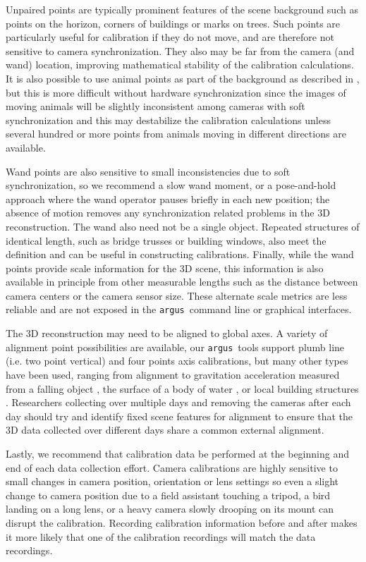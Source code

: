\documentclass[fleqn,10pt]{wlpeerj}
\newcommand{\argus}{\texttt{argus}}
\begin{document}
Unpaired points are typically prominent features of the scene background such as points on the horizon, corners of buildings or marks on trees. Such points are particularly useful for calibration if they do not move, and are therefore not sensitive to camera synchronization.  They also may be far from the camera (and wand) location, improving mathematical stability of the calibration calculations. It is also possible to use animal points as part of the background as described in \citep{Theriault:2014}, but this is more difficult without hardware synchronization since the images of moving animals will be slightly inconsistent among cameras with soft synchronization and this may destabilize the calibration calculations unless several hundred or more points from animals moving in different directions are available.

Wand points are also sensitive to small inconsistencies due to soft synchronization, so we recommend a slow wand moment, or a pose-and-hold approach where the wand operator pauses briefly in each new position; the absence of motion removes any synchronization related problems in the 3D reconstruction. The wand also need not be a single object.  Repeated structures of identical length, such as bridge trusses or building windows, also meet the definition and can be useful in constructing calibrations. Finally, while the wand points provide scale information for the 3D scene, this information is also available in principle from other measurable lengths such as the distance between camera centers or the camera sensor size. These alternate scale metrics are less reliable and are not exposed in the \argus\ command line or graphical interfaces.

The 3D reconstruction may need to be aligned to global axes.  A variety of alignment point possibilities are available, our \argus\ tools support plumb line (i.e. two point vertical) and four points axis calibrations, but many other types have been used, ranging from alignment to gravitation acceleration measured from a falling object \citep{Shelton14}, the surface of a body of water \citep{clifton2015}, or local building structures \citep{sholtis2015}. Researchers collecting over multiple days and removing the cameras after each day should try and identify fixed scene features for alignment to ensure that the 3D data collected over different days share a common external alignment.

Lastly, we recommend that calibration data be performed at the beginning and end of each data collection effort. Camera calibrations are highly sensitive to small changes in camera position, orientation or lens settings so even a slight change to camera position due to a field assistant touching a tripod, a bird landing on a long lens, or a heavy camera slowly drooping on its mount can disrupt the calibration. Recording calibration information before and after makes it more likely that one of the calibration recordings will match the data recordings.
\end{document}
